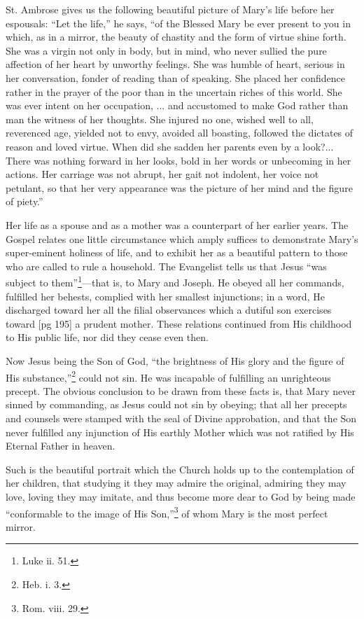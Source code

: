 St. Ambrose gives us the following beautiful
picture of Mary's life before her espousals: “Let
the life,” he says, “of the Blessed Mary be ever
present to you in which, as in a mirror, the beauty
of chastity and the form of virtue shine forth.
She was a virgin not only in body, but in mind,
who never sullied the pure affection of her heart
by unworthy feelings. She was humble of heart,
serious in her conversation, fonder of reading
than of speaking. She placed her confidence
rather in the prayer of the poor than in the uncertain
riches of this world. She was ever intent
on her occupation, ... and accustomed to
make God rather than man the witness of her
thoughts. She injured no one, wished well to
all, reverenced age, yielded not to envy, avoided
all boasting, followed the dictates of reason and
loved virtue. When did she sadden her parents
even by a look?... There was nothing forward
in her looks, bold in her words or unbecoming
in her actions. Her carriage was not abrupt, her
gait not indolent, her voice not petulant, so that
her very appearance was the picture of her mind
and the figure of piety.”

Her life as a spouse and as a mother was a
counterpart of her earlier years. The Gospel relates
one little circumstance which amply suffices
to demonstrate Mary's super-eminent holiness of
life, and to exhibit her as a beautiful pattern to
those who are called to rule a household. The
Evangelist tells us that Jesus “was subject to
them”\footnote{Luke ii.
51.}—that is, to Mary and Joseph. He
obeyed all her commands, fulfilled her behests,
complied with her smallest injunctions; in a
word, He discharged toward her all the filial observances
which a dutiful son exercises toward
[pg 195]
a prudent mother. These relations continued
from His childhood to His public life, nor did
they cease even then.

Now Jesus being the Son of God, “the brightness
of His glory and the figure of His substance,”\footnote{Heb. i. 3.}
could not sin. He was incapable of fulfilling
an unrighteous precept. The obvious conclusion
to be drawn from these facts is, that Mary
never sinned by commanding, as Jesus could not
sin by obeying; that all her precepts and counsels
were stamped with the seal of Divine approbation,
and that the Son never fulfilled any injunction
of His earthly Mother which was not
ratified by His Eternal Father in heaven.

Such is the beautiful portrait which the Church
holds up to the contemplation of her children,
that studying it they may admire the original,
admiring they may love, loving they may imitate,
and thus become more dear to God by being made
“conformable to the image of His Son,”\footnote{Rom. viii. 29.} of
whom Mary is the most perfect mirror.

